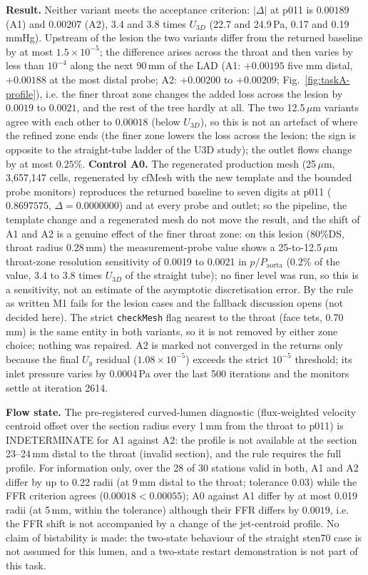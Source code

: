 \documentclass[11pt]{article}
\begin{document}
\textbf{Result.} Neither variant meets the acceptance criterion: $|\Delta|$ at p011 is $0.00189$ (A1) and $0.00207$ (A2), 3.4 and 3.8 times $U_{3D}$ (22.7 and 24.9\,Pa, 0.17 and 0.19\,mmHg). Upstream of the lesion the two variants differ from the returned baseline by at most $1.5\times10^{-5}$; the difference arises across the throat and then varies by less than $10^{-4}$ along the next 90\,mm of the LAD (A1: $+0.00195$ five mm distal, $+0.00188$ at the most distal probe; A2: $+0.00200$ to $+0.00209$; Fig.~\ref{fig:taskA-profile}), i.e. the finer throat zone changes the added loss across the lesion by $0.0019$ to $0.0021$, and the rest of the tree hardly at all. The two 12.5\,$\mu$m variants agree with each other to $0.00018$ (below $U_{3D}$), so this is not an artefact of where the refined zone ends (the finer zone lowers the loss across the lesion; the sign is opposite to the straight-tube ladder of the U3D study); the outlet flows change by at most $0.25\%$. \textbf{Control A0.} The regenerated production mesh (25\,$\mu$m, 3{,}657{,}147 cells, regenerated by cfMesh with the new template and the bounded probe monitors) reproduces the returned baseline to seven digits at p011 ($0.8697575$, $\Delta=0.0000000$) and at every probe and outlet; so the pipeline, the template change and a regenerated mesh do not move the result, and the shift of A1 and A2 is a genuine effect of the finer throat zone: on this lesion (80\%DS, throat radius 0.28\,mm) the measurement-probe value shows a 25-to-12.5\,$\mu$m throat-zone resolution sensitivity of 0.0019 to 0.0021 in $p/P_\text{aorta}$ (0.2\% of the value, 3.4 to 3.8 times $U_{3D}$ of the straight tube); no finer level was run, so this is a sensitivity, not an estimate of the asymptotic discretisation error. By the rule as written M1 fails for the lesion cases and the fallback discussion opens (not decided here). The strict \texttt{checkMesh} flag nearest to the throat (face tets, 0.70\,mm) is the same entity in both variants, so it is not removed by either zone choice; nothing was repaired. A2 is marked not converged in the returns only because the final $U_y$ residual ($1.08\times10^{-5}$) exceeds the strict $10^{-5}$ threshold; its inlet pressure varies by 0.0004\,Pa over the last 500 iterations and the monitors settle at iteration 2614.

\textbf{Flow state.} The pre-registered curved-lumen diagnostic (flux-weighted velocity centroid offset over the section radius every 1\,mm from the throat to p011) is INDETERMINATE for A1 against A2: the profile is not available at the section 23--24\,mm distal to the throat (invalid section), and the rule requires the full profile. For information only, over the 28 of 30 stations valid in both, A1 and A2 differ by up to 0.22 radii (at 9\,mm distal to the throat; tolerance 0.03) while the FFR criterion agrees ($0.00018<0.00055$); A0 against A1 differ by at most 0.019 radii (at 5\,mm, within the tolerance) although their FFR differs by $0.0019$, i.e. the FFR shift is not accompanied by a change of the jet-centroid profile. No claim of bistability is made: the two-state behaviour of the straight sten70 case is not assumed for this lumen, and a two-state restart demonstration is not part of this task.
\end{document}

